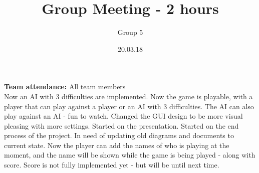\documentclass{article}
\title{Group Meeting - 2 hours}
\author{Group 5}
\date{20.03.18}
\begin{document}
	\maketitle
	\noindent
	\textbf{Team attendance:} All team members \\

	\noindent
	Now an AI with 3 difficulties are implemented. Now the game is playable, with a player that can play against a player or an AI
	with 3 difficulties. The AI can also play against an AI - fun to watch. Changed the GUI design to be more visual pleasing with more settings. Started on the presentation. Started on the end process
	of the project. In need of updating old diagrams and documents to current state. Now the player can add the names of who is playing at the moment,
	and the name will be shown while the game is being played - along with score. Score is not fully implemented yet - but will be until next time.
	
\end{document}
